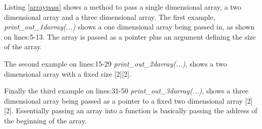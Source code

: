 Listing \ref{arraypass} shows a method to pass a single dimensional array, a two dimensional array and a three dimensional array. The first example, \textit{print\_out\_1darray(...)} shows a one dimensional array being passed in, as shown on lines:5-13. The array is passed as a pointer plus an argument defining the size of the array. 

The second example on lines:15-29 \textit{print\_out\_2darray(...)}, shows a two dimensional array with a fixed size [2][2]. 

Finally the third example on lines:31-50 \textit{print\_out\_3darray(...)}, shows a three dimensional array being passed as a pointer to a fixed two dimensional array [2][2]. Essentially passing an array into a function is basically passing the address of the beginning of the array. 

